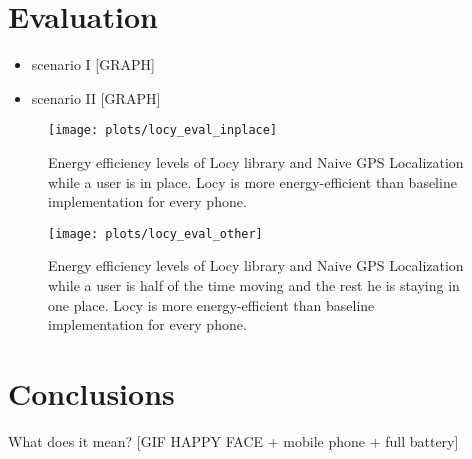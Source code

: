 \documentclass[a2,landscape]{a0poster}
\begin{document}
\mbox{}\framebreak
\section*{Evaluation}
\begin{itemize}
   \item scenario I [GRAPH]
   \item scenario II [GRAPH]
  \end{itemize}
  
\begin{figure}[H]
\texttt{[image: plots/locy\_eval\_inplace]}
\caption{\label{p:locy_eval_place} \footnotesize{Energy efficiency levels of Locy library and Naive GPS Localization while a user is in place. Locy is more energy-efficient than baseline implementation for every phone.} }
\end{figure}


\begin{figure}[H]
\texttt{[image: plots/locy\_eval\_other]}
\caption{\label{p:locy_eval_other} \footnotesize{Energy efficiency levels of Locy library and Naive GPS Localization while a user is half of the time moving and the rest he is staying in one place. Locy is more energy-efficient than baseline implementation for every phone.} }
\end{figure}



\section*{Conclusions}
What does it mean?
[GIF HAPPY FACE + mobile phone + full battery]
\end{document}
